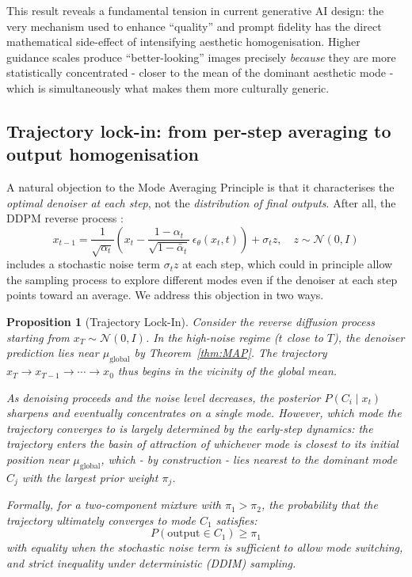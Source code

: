 \documentclass[11pt]{article}
\newtheorem{proposition}[theorem]{Proposition}
\begin{document}
This result reveals a fundamental tension in current generative AI design: the very mechanism used to enhance ``quality'' and prompt fidelity has the direct mathematical side-effect of intensifying aesthetic homogenisation. Higher guidance scales produce ``better-looking'' images precisely \textit{because} they are more statistically concentrated - closer to the mean of the dominant aesthetic mode - which is simultaneously what makes them more culturally generic.

\subsection{Trajectory lock-in: from per-step averaging to output homogenisation}\label{sec:trajectory}

A natural objection to the Mode Averaging Principle is that it characterises the \textit{optimal denoiser at each step}, not the \textit{distribution of final outputs}. After all, the DDPM reverse process \citep{Ho2020}:
$$x_{t-1} = \frac{1}{\sqrt{\alpha_t}}\left(x_t - \frac{1-\alpha_t}{\sqrt{1-\bar{\alpha}_t}}\, \epsilon_\theta(x_t, t)\right) + \sigma_t z, \quad z \sim \mathcal{N}(0, I)$$
includes a stochastic noise term $\sigma_t z$ at each step, which could in principle allow the sampling process to explore different modes even if the denoiser at each step points toward an average. We address this objection in two ways.

\begin{proposition}[Trajectory Lock-In]\label{prop:lockin}
Consider the reverse diffusion process starting from $x_T \sim \mathcal{N}(0, I)$. In the high-noise regime ($t$ close to $T$), the denoiser prediction lies near $\mu_{\mathrm{global}}$ by Theorem~\ref{thm:MAP}. The trajectory $x_T \to x_{T-1} \to \cdots \to x_0$ thus begins in the vicinity of the global mean.

As denoising proceeds and the noise level decreases, the posterior $P(C_i \mid x_t)$ sharpens and eventually concentrates on a single mode. However, which mode the trajectory converges to is largely determined by the early-step dynamics: the trajectory enters the basin of attraction of whichever mode is closest to its initial position near $\mu_{\mathrm{global}}$, which - by construction - lies nearest to the dominant mode $C_j$ with the largest prior weight $\pi_j$.

Formally, for a two-component mixture with $\pi_1 > \pi_2$, the probability that the trajectory ultimately converges to mode $C_1$ satisfies:
$$P(\text{output} \in C_1) \geq \pi_1$$
with equality when the stochastic noise term is sufficient to allow mode switching, and strict inequality under deterministic (DDIM) sampling.
\end{proposition}
\end{document}
